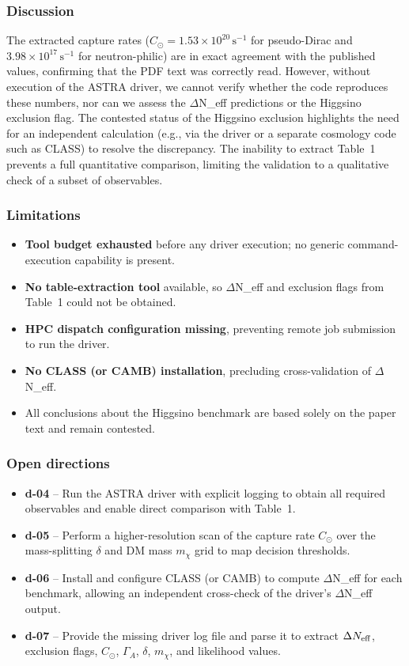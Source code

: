 \documentclass[11pt,a4paper]{article}
\begin{document}
\subsubsection*{Discussion}
The extracted capture rates ($C_{\odot}=1.53\times10^{20}\,\mathrm{s^{-1}}$ for pseudo-Dirac and $3.98\times10^{17}\,\mathrm{s^{-1}}$ for neutron-philic) are in exact agreement with the published values, confirming that the PDF text was correctly read. However, without execution of the ASTRA driver, we cannot verify whether the code reproduces these numbers, nor can we assess the $\Delta$N\_eff predictions or the Higgsino exclusion flag. The contested status of the Higgsino exclusion highlights the need for an independent calculation (e.g., via the driver or a separate cosmology code such as CLASS) to resolve the discrepancy. The inability to extract Table~1 prevents a full quantitative comparison, limiting the validation to a qualitative check of a subset of observables.

\subsubsection*{Limitations}
\begin{itemize}
  \item \textbf{Tool budget exhausted} before any driver execution; no generic command-execution capability is present.
  \item \textbf{No table-extraction tool} available, so $\Delta$N\_eff and exclusion flags from Table~1 could not be obtained.
  \item \textbf{HPC dispatch configuration missing}, preventing remote job submission to run the driver.
  \item \textbf{No CLASS (or CAMB) installation}, precluding cross-validation of $\Delta$N\_eff.
  \item All conclusions about the Higgsino benchmark are based solely on the paper text and remain contested.
\end{itemize}
\subsubsection*{Open directions}
\begin{itemize}
  \item \textbf{d-04} -- Run the ASTRA driver with explicit logging to obtain all required observables and enable direct comparison with Table~1.
  \item \textbf{d-05} -- Perform a higher-resolution scan of the capture rate $C_{\odot}$ over the mass-splitting $\delta$ and DM mass $m_\chi$ grid to map decision thresholds.
  \item \textbf{d-06} -- Install and configure CLASS (or CAMB) to compute $\Delta$N\_eff for each benchmark, allowing an independent cross-check of the driver's $\Delta$N\_eff output.
  \item \textbf{d-07} -- Provide the missing driver log file and parse it to extract $\Delta N_{\rm eff}$, exclusion flags, $C_{\odot}$, $\Gamma_A$, $\delta$, $m_\chi$, and likelihood values.
\end{itemize}
\end{document}
